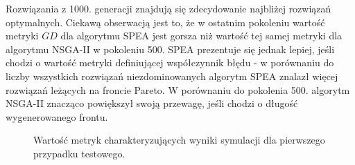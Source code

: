 \documentclass[twoside]{iisthesis}
\begin{document}
Rozwiązania z 1000. generacji znajdują się zdecydowanie najbliżej rozwiązań optymalnych. Ciekawą obserwacją jest to, że w ostatnim pokoleniu wartość metryki $GD$ dla algorytmu SPEA jest gorsza niż wartość tej samej metryki dla algorytmu NSGA-II w pokoleniu 500. SPEA prezentuje się jednak lepiej, jeśli chodzi o wartość metryki definiującej współczynnik błędu - w porównaniu do liczby wszystkich rozwiązań niezdominowanych algorytm SPEA znalazł więcej rozwiązań leżących na froncie Pareto. W porównaniu do pokolenia 500. algorytm NSGA-II znacząco powiększył swoją przewagę, jeśli chodzi o długość wygenerowanego frontu.\newpage
\begin{figure}\centering
{}
    \hfill
{}

    \hfill
{}
\caption{Wartość metryk charakteryzujących wyniki symulacji dla pierwszego przypadku testowego.}
    \label{fig:small_metrics}
\end{figure}
\end{document}
